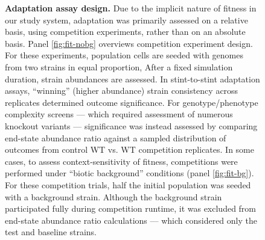\begin{figure}
\caption{%
\textbf{Adaptation assay design.}
\footnotesize
Due to the implicit nature of fitness in our study system, adaptation was primarily assessed on a relative basis, using competition experiments, rather than on an absolute basis.
Panel \ref{fig:fit-nobg} overviews competition experiment design.
For these experiments, population cells are seeded with genomes from two strains in equal proportion,
After a fixed simulation duration, strain abundances are assessed.
In stint-to-stint adaptation assays, ``winning'' (higher abundance) strain consistency across replicates determined outcome significance.
For genotype/phenotype complexity screens --- which required assessment of numerous knockout variants --- significance was instead assessed by comparing end-state abundance ratio against a sampled distribution of outcomes from control WT vs. WT competition replicates.
In some cases, to assess context-sensitivity of fitness, competitions were performed under ``biotic background'' conditions (panel \ref{fig:fit-bg}).
For these competition trials, half the initial population was seeded with a background strain.
Although the background strain participated fully during competition runtime, it was excluded from end-state abundance ratio calculations --- which considered only the test and baseline strains.
}
\label{fig:fit}

\end{figure}
